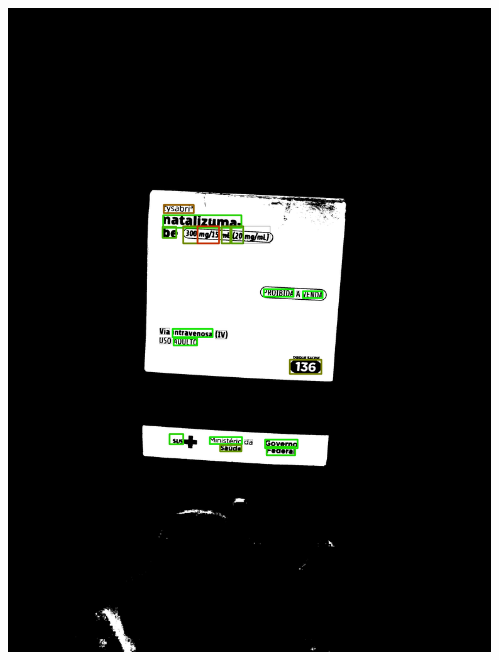 \begin{frame}
\begin{columns}
\begin{column}{0.24\textwidth}
			\includegraphics[height=0.35\textheight]{../pictures/tysabri_cmyk_c_only_thresh_boxes.jpg}
		\end{column}
		\begin{column}{0.24\textwidth}\centering

\end{column}
\end{columns}
\end{frame}
